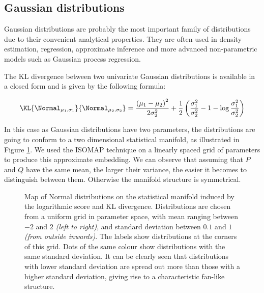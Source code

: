 
\subsection{Gaussian distributions}

Gaussian distributions are probably the most important family of distributions due to their convenient analytical properties. They are often used in density estimation, regression, approximate inference and more advanced non-parametric models such as Gaussian process regression.

The KL divergence between two univariate Gaussian distributions is available in a closed form and is given by the following formula:

\begin{equation}
	\KL{\Normal_{\mu_1,\sigma_1}}{\Normal_{\mu_2,\sigma_2}} = \frac{\left(\mu_1 - \mu_2\right)^2}{2\sigma_2^2} + \frac{1}{2}\left(\frac{\sigma_1^2}{\sigma_2^2} - 1 - \log\frac{\sigma_1^2}{\sigma_2^2}\right)
\end{equation}

In this case as Gaussian distributions have two parameters, the distributions are going to conform to a two dimensional statistical manifold, as illustrated in Figure \ref{fig:Normal_meanvar}. We used the ISOMAP technique on a linearly spaced grid of parameters to produce this approximate embedding. We can observe that assuming that $P$ and $Q$ have the same mean, the larger their variance, the easier it becomes to distinguish between them. Otherwise the manifold structure is symmetrical.

\begin{figure} %
	\begin{center}
	\end{center}
	\caption[Map of Normal distributions by the KL divergence]{Map of Normal distributions on the statistical manifold induced by the logarithmic score and KL divergence. Distributions are chosen from a uniform grid in parameter space, with mean ranging between $-2$ and $2$ \emph{(left to right)}, and standard deviation between $0.1$ and $1$ \emph{(from outside inwards)}. The labels show distributions at the corners of this grid.  Dots of the same colour show distributions with the same standard deviation. It can be clearly seen that distributions with lower standard deviation are spread out more than those with a higher standard deviation, giving rise to a characteristic fan-like structure.}
	\label{fig:Normal_meanvar}
\end{figure}

